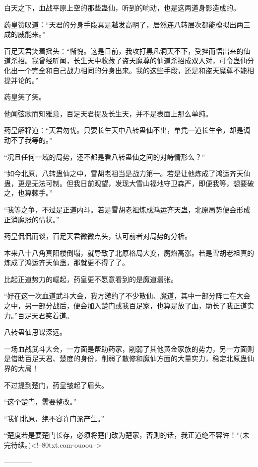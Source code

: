 \begin{this_body}
白天之下，血战平原上空的那些蛊仙，听到的响动，也是这两道身影造成的。

药皇赞叹道：“天君的分身手段真是越发高明了，居然连八转层次都能模拟出两三成的威能来。”

百足天君笑着摇头：“惭愧。这是日前，我攻打黑凡洞天不下，受挫而悟出来的仙道杀招。我曾经听闻，长生天中收藏了盗天魔尊的仙道杀招成双入对，可令蛊仙分化出一个完全和自己战力相同的分身出来。我的这些手段，还是和盗天魔尊不能相提并论的。”

药皇笑了笑。

他闻弦歌而知雅意，百足天君提及长生天，并不是表面上那么单纯。

药皇解释道：“天君勿忧。只要长生天中八转蛊仙不出，单凭一道长生令，却是调动不了我等的。”

“况且任何一域的局势，还不都是看八转蛊仙之间的对峙情形么？”

“如今北原，八转蛊仙之中，雪胡老祖当是战力第一。若是让他炼成了鸿运齐天仙蛊，更是无法可制。但我日前观望，发现大雪山福地守卫森严，即便我等，想要破之，也算棘手。”

“我等之争，不过是正道内斗。若是雪胡老祖炼成鸿运齐天蛊，北原局势便会形成正消魔涨的情状。”

药皇侃侃而谈，百足天君微微点头，认可前者对局势的分析。

本来八十八角真阳楼倒塌，就导致了北原格局大变，魔焰高涨。若是雪胡老祖真的炼成了鸿运齐天仙蛊，那就更不得了了。

比起正道势力的崛起，药皇更不愿意看到的是魔道嚣张。

“好在这一次血道武斗大会，我方邀约了不少散仙、魔道，其中一部分阵亡在大会之中，另一部分战后，便会加入楚门或我百足家，也算是放了血，助长了我正道实力。”百足天君笑着道。

八转蛊仙思谋深远。

一场血战武斗大会，一方面是帮助药家，削弱了其他黄金家族的势力，另一方面则是借助百足天君、楚度的身份，削弱了散修和魔仙方面的大量实力，稳定北原蛊仙界的大局！

不过提到楚门，药皇皱起了眉头。

“这个楚门，需要整改。”

“我们北原，绝不容许门派产生。”

“楚度若是要楚门长存，必须将楚门改为楚家，否则的话，我正道绝不容许！”(未完待续。)<!--80txt.com-ouoou-->

------------

\end{this_body}


